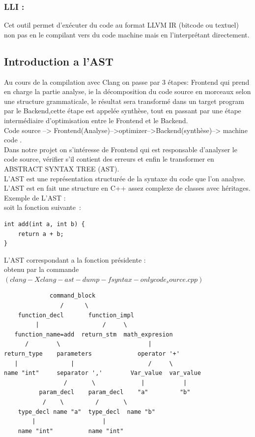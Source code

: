 \documentclass[12pt,titlepage]{article}
\begin{document}
    \subsubsection{ LLI : } 
    Cet outil permet d’exécuter du code au format LLVM IR (bitcode ou textuel) non pas en le compilant vers du code machine mais en l’interprétant directement.
    
\subsection{Introduction a l'AST}

Au cours de la compilation avec Clang on passe par 3 étapes: Frontend qui prend en charge la partie analyse, ie la décomposition du code source en morceaux selon une structure grammaticale, le résultat sera transformé  dans un target program par le Backend,cette étape est appelée synthèse, tout en passant par une étape intermédiaire d'optimisation entre le Frontend et le Backend.\\
Code source --> Frontend(Analyse)-->optimizer-->Backend(synthèse)--> machine code .\\
Dans notre projet on s’intéresse de Frontend qui est responsable d'analyser le code source, vérifier s'il contient des erreurs et enfin le transformer en ABSTRACT SYNTAX TREE (AST).\\
L'AST est une représentation structurée de la syntaxe du code que l'on analyse. \\
L'AST est en fait une structure en C++ assez complexe de classes avec héritages.\\
Exemple de L'AST :\\
soit la fonction  suivante :

\begin{lstlisting}
int add(int a, int b) {
    return a + b;
}
\end{lstlisting}

L'AST correspondant a la fonction présidente :\\
obtenu par la commande $(clang -Xclang -ast-dump -fsyntax-only code_source.cpp) $
\begin{lstlisting}
             command_block
                /      \
    function_decl       function_impl
         |                  /     \
   function_name=add  return_stm  math_expresion
      /        \                         |
return_type    parameters             operator '+'
   |               |                     /     \
name "int"     separator ','        Var_value  var_value
                 /       \             |           |
          param_decl    param_decl    "a"         "b"
           /    \         /       \
    type_decl name "a"  type_decl  name "b"
        |                   |
    name "int"          name "int"
\end{lstlisting}
\end{document}
